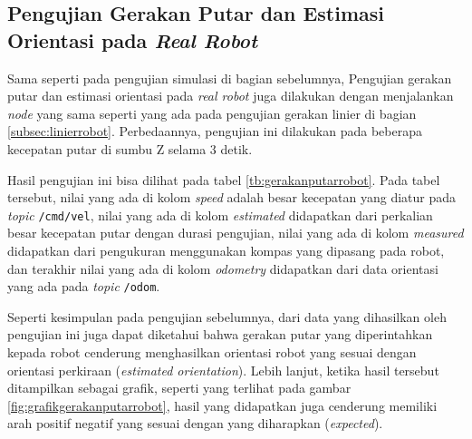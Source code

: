 \subsection{Pengujian Gerakan Putar dan Estimasi Orientasi pada \emph{Real Robot}}
\label{subsec:putarrobot}

Sama seperti pada pengujian simulasi di bagian sebelumnya,
  Pengujian gerakan putar dan estimasi orientasi pada \emph{real robot} juga dilakukan dengan menjalankan \emph{node} yang sama seperti yang ada pada pengujian gerakan linier di bagian \ref{subsec:linierrobot}.
Perbedaannya, pengujian ini dilakukan pada beberapa kecepatan putar di sumbu Z selama 3 detik.

Hasil pengujian ini bisa dilihat pada tabel \ref{tb:gerakanputarrobot}.
Pada tabel tersebut, nilai yang ada di kolom \emph{speed} adalah besar kecepatan yang diatur pada \emph{topic} \lstinline{/cmd/vel},
  nilai yang ada di kolom \emph{estimated} didapatkan dari perkalian besar kecepatan putar dengan durasi pengujian,
  nilai yang ada di kolom \emph{measured} didapatkan dari pengukuran menggunakan kompas yang dipasang pada robot,
  dan terakhir nilai yang ada di kolom \emph{odometry} didapatkan dari data orientasi yang ada pada \emph{topic} \lstinline{/odom}.



Seperti kesimpulan pada pengujian sebelumnya,
  dari data yang dihasilkan oleh pengujian ini juga dapat diketahui bahwa gerakan putar yang diperintahkan kepada robot cenderung menghasilkan orientasi robot yang sesuai dengan orientasi perkiraan (\emph{estimated orientation}).
Lebih lanjut, ketika hasil tersebut ditampilkan sebagai grafik,
  seperti yang terlihat pada gambar \ref{fig:grafikgerakanputarrobot},
  hasil yang didapatkan juga cenderung memiliki arah positif negatif yang sesuai dengan yang diharapkan (\emph{expected}).


